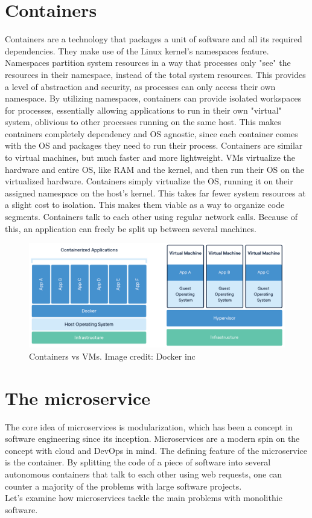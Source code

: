 \section{Containers}
Containers are a technology that packages a unit of software and all its required dependencies.
They make use of the Linux kernel's namespaces feature.
Namespaces partition system resources in a way that processes only "see" the resources in their namespace, instead of the total system resources. 
This provides a level of abstraction and security, as processes can only access their own namespace.
By utilizing namespaces, containers can provide isolated workspaces for processes, essentially allowing applications to run in their own "virtual" system, oblivious to other processes running on the same host.
This makes containers completely dependency and OS agnostic,
since each container comes with the OS and packages they need to run their process.
Containers are similar to virtual machines, but much faster and more lightweight.
VMs virtualize the hardware and entire OS, like RAM and the kernel, and then run their OS on the virtualized hardware. 
Containers simply virtualize the OS, running it on their assigned namespace on the host's kernel.
This takes far fewer system resources at a slight cost to isolation.
This makes them viable as a way to organize code segments.
Containers talk to each other using regular network calls. 
Because of this, an application can freely be split up between several machines.

\begin{figure}[ht] 
\centering 
\includegraphics[width=\columnwidth]{Figures/containers_vs_VMs.png}
\caption{Containers vs VMs. Image credit: Docker inc}
\label{Containers}
\end{figure}


\section{The microservice}
The core idea of microservices is modularization, which has been a concept in software engineering since its inception. 
Microservices are a modern spin on the concept with cloud and DevOps in mind. 
The defining feature of the microservice is the container. 
By splitting the code of a piece of software into several autonomous containers that talk to each other using web requests, 
one can counter a majority of the problems with large software projects. \\
Let's examine how microservices tackle the main problems with monolithic software.

